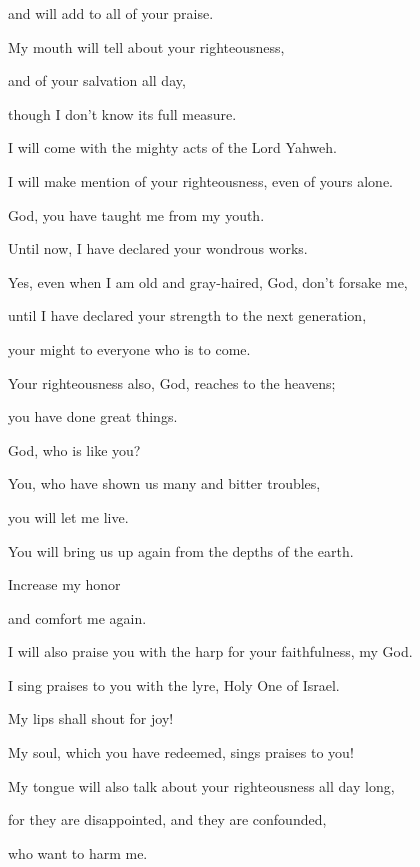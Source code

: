 {\par }{\QB and will add to all of your praise.
\par }{\Q {}My mouth will tell about your righteousness,
\par }{\QB and of your salvation all day,
\par }{\QB though I don’t know its full measure.
\par }{\Q {}I will come with the mighty acts of the Lord Yahweh.
\par }{\QB I will make mention of your righteousness, even of yours alone.
\par }{\Q {}God, you have taught me from my youth.
\par }{\QB Until now, I have declared your wondrous works.
\par }{\Q {}Yes, even when I am old and gray-haired, God, don’t forsake me,
\par }{\QB until I have declared your strength to the next generation,
\par }{\QB your might to everyone who is to come.
\par }{\Q {}Your righteousness also, God, reaches to the heavens;
\par }{\QB you have done great things.
\par }{\QB God, who is like you?
\par }{\Q {}You, who have shown us many and bitter troubles,
\par }{\QB you will let me live.
\par }{\QB You will bring us up again from the depths of the earth.
\par }{\Q {}Increase my honor
\par }{\QB and comfort me again.
\par }{\Q {}I will also praise you with the harp for your faithfulness, my God.
\par }{\QB I sing praises to you with the lyre, Holy One of Israel.
\par }{\Q {}My lips shall shout for joy!
\par }{\QB My soul, which you have redeemed, sings praises to you!
\par }{\Q {}My tongue will also talk about your righteousness all day long,
\par }{\QB for they are disappointed, and they are confounded,
\par }{\QB who want to harm me.

}
